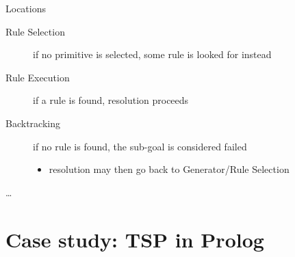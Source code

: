 \documentclass[presentation]{beamer}
\begin{document}
\begin{frame}[allowframebreaks]
\begin{block}{Locations}
\begin{description}
            \item[\textsf{Rule Selection}] if no primitive is selected, some rule is looked for instead
            
            \item[\textsf{Rule Execution}] if a rule is found, resolution proceeds 
            
            \item[\textsf{Backtracking}] if no rule is found, the sub-goal is considered failed 
            \begin{itemize}
                \item resolution may then go back to \textsf{Generator/Rule Selection}
            \end{itemize}

            \item[\ldots]
        \end{description}
    \end{block}

    \hfill{}

\end{frame}

\section{Case study: TSP in Prolog}
\end{document}
